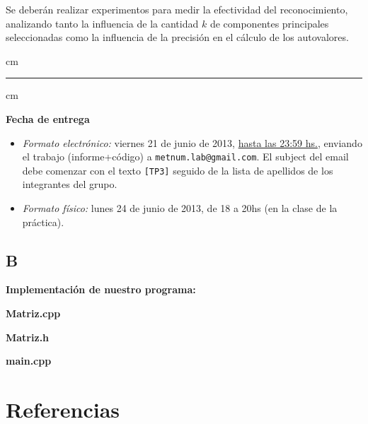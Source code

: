 \documentclass[10pt, a4paper]{article}
\begin{document}
Se deber\'an realizar experimentos para medir la efectividad del reconocimiento, analizando tanto la influencia de la cantidad $k$ de componentes principales seleccionadas como la influencia de la precisi\'on en el c\'alculo de los autovalores.

 cm
\hrule
{} cm

{\bf Fecha de entrega} 
\begin{itemize}
\item \textsl{Formato electr\'onico:} viernes 21 de junio de 2013, \underline{hasta las 23:59 hs.}, enviando el trabajo (informe+c\'odigo) a \texttt{metnum.lab@gmail.com}. El subject del email debe comenzar con el texto \verb|[TP3]| seguido de la lista de apellidos de los integrantes del grupo. 
\item \textsl{Formato f\'isico:} lunes 24 de junio de 2013, de 18 a 20hs (en la clase de la pr\'actica).
\end{itemize}

\subsection{B}

\large{\textbf{Implementaci\'on de nuestro programa:}}\newline

\centerline{\large{\textbf{Matriz.cpp}}}



\centerline{\large{\textbf{Matriz.h}}}


\centerline{\large{\textbf{main.cpp}}}


\section{Referencias}

\end{document}
